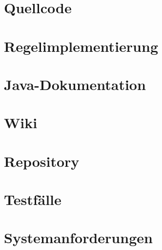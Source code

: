 \documentclass[a4paper,10pt,bibtotoc,twoside,openright,pointlessnumbers,normalheadings,DIV=9
,draft
]{scrbook}
\begin{document}

\tableofcontents



\mainmatter











 



 

%


\appendix
\section*{Quellcode}
\section*{Regelimplementierung}
\section*{Java-Dokumentation}
\section*{Wiki}
\section*{Repository}
\section*{Testfälle}
\section*{Systemanforderungen}

%

\backmatter



\end{document}
